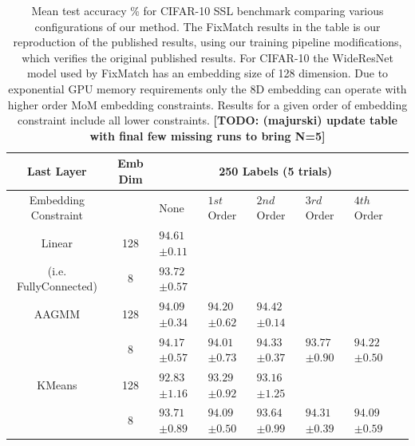 \documentclass[10pt,twocolumn,letterpaper]{article}
\newcommand{\TODO}[1]{\textbf{\color{red}[TODO: #1]}}
\begin{document}
\begin{table}[ht!]
\begin{tabularx}{\textwidth}{c|c|XXXXXX}
		\hline\hline
		Last Layer  &   Emb Dim  & \multicolumn{5}{c}{250 Labels (5 trials)}            \\ 
		\hline
		\multicolumn{1}{c|}{Embedding Constraint} &  & None & $1st$ Order & $2nd$ Order & $3rd$ Order & $4th$ Order  \\ 
		\hline
		Linear & 128  & $94.61$ \scriptsize{$\pm 0.11$}   &  &  &  &   \\
		(i.e. FullyConnected) & 8  & $93.72$ \scriptsize{$\pm 0.57$}      &  &  &  &   \\
		\hline
		AAGMM & 128  & $94.09$ \scriptsize{$\pm 0.34$}    & $94.20$ \scriptsize{$\pm 0.62$} & $94.42$ \scriptsize{$\pm 0.14$} &  &  \\
		& 8  & $94.17$ \scriptsize{$\pm 0.57$}    & $94.01$ \scriptsize{$\pm 0.73$} & $94.33$ \scriptsize{$\pm 0.37$} & $93.77$ \scriptsize{$\pm 0.90$} & $94.22$ \scriptsize{$\pm 0.50$} \\
		\hline
		KMeans & 128  & $92.83$ \scriptsize{$\pm 1.16$}    & $93.29$ \scriptsize{$\pm 0.92$} & $93.16$ \scriptsize{$\pm 1.25$} &  &  \\
		& 8  & $93.71$ \scriptsize{$\pm 0.89$}    & $94.09$ \scriptsize{$\pm 0.50$} & $93.64$ \scriptsize{$\pm 0.99$} & $94.31$ \scriptsize{$\pm 0.39$} & $94.09$ \scriptsize{$\pm 0.59$}  \\
	\end{tabularx}
	\caption{Mean test accuracy \% for CIFAR-10 SSL benchmark comparing various configurations of our method. The FixMatch results in the table is our reproduction of the published results, using our training pipeline modifications, which verifies the original published results. For CIFAR-10 the WideResNet model used by FixMatch has an embedding size of 128 dimension. Due to exponential GPU memory requirements only the 8D embedding can operate with higher order MoM embedding constraints. Results for a given order of embedding constraint include all lower constraints. \TODO{(majurski) update table with final few missing runs to bring N=5}}
	\label{table1}
\end{table}
\end{document}
